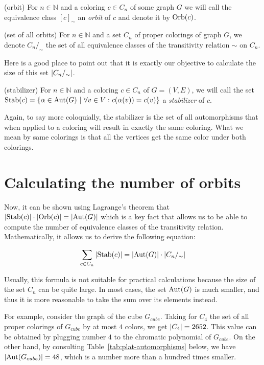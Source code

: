 \begin{defn}(orbit)
    For $n \in \mathbb{N}$ and a coloring $c \in C_n$ of some graph $G$ we will call the equivalence class $[c]_{\sim}$ an \emph{orbit} of $c$ and denote it by $\operatorname{Orb}(c)$.
\end{defn}

\begin{defn}(set of all orbits)
    For $n \in \mathbb{N}$ and a set $C_n$ of proper colorings of graph $G$, we denote $C_n/_\sim$ the set of all equivalence classes of the transitivity relation $\sim$ on $C_n$.
\end{defn}

Here is a good place to point out that it is exactly our objective to calculate the size of this set $\left|{C_n/_\sim}\right|$.

\begin{defn}(stabilizer)
    For $n \in \mathbb{N}$ and a coloring $c \in C_n$ of $G=(V,E)$, we will call the set $\operatorname{Stab}(c) = \{ \alpha \in \operatorname{Aut}(G) \ | \ \forall v \in V : c(\alpha(v)) = c(v) \}$ a \emph{stabilizer} of $c$. 
\end{defn}

Again, to say more coloquially, the stabilizer is the set of all automorphisms that when applied to a coloring will result in exactly the same coloring. What we mean by same colorings is that all the vertices get the same color under both colorings.

\section{Calculating the number of orbits}

Now, it can be shown using Lagrange's theorem that $\left|{\operatorname{Stab}(c)}\right| \cdot \left|{\operatorname{Orb}(c)}\right| = \left|{\operatorname{Aut}(G)}\right|$ which is a key fact that allows us to be able to compute the number of equivalence classes of the transitivity relation. Mathematically, it allows us to derive the following equation:

\begin{equation}\label{eqn:orbits-by-stab}
    \sum_{c\in C_n}\left|{\operatorname{Stab}(c)}\right| = \left|{\operatorname{Aut}(G)}\right| \cdot \left|{C_n/_\sim}\right| 
\end{equation}


Usually, this formula is not suitable for practical calculations because the size of the set $C_n$ can be quite large. In most cases, the set $\operatorname{Aut}(G)$ is much smaller, and thus it is more reasonable to take the sum over its elements instead. 

For example, consider the graph of the cube $G_{cube}$. Taking for $C_4$ the set of all proper colorings of $G_{cube}$ by at most $4$ colors, we get $\left|{C_4}\right| = 2652$. This value can be obtained by plugging number $4$ to the chromatic polynomial of $G_{cube}$. On the other hand, by consulting Table~\ref{tab:plat-automorphisms} below, we have $\left|{\operatorname{Aut}(G_{cube})}\right| = 48$, which is a number more than a hundred times smaller.

